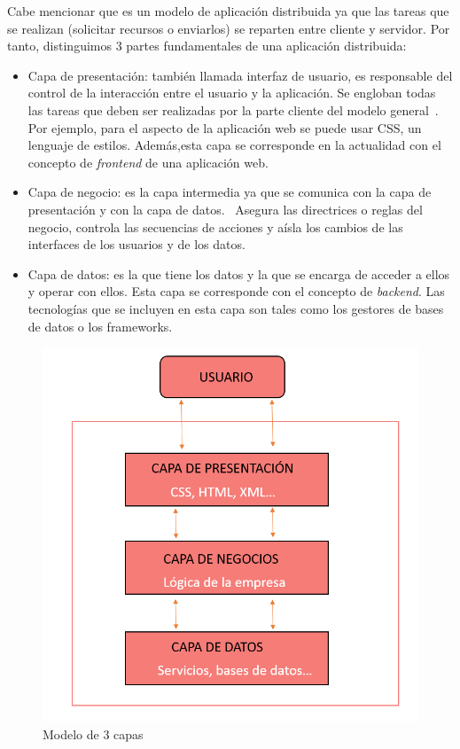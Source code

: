 \documentclass[a4paper, 12pt]{book}
\begin{document}
Cabe mencionar que es un modelo de aplicación distribuida ya que las tareas que se realizan (solicitar recursos o enviarlos) se reparten entre cliente y servidor. Por tanto, distinguimos 3 partes fundamentales de una aplicación distribuida:
\begin{itemize}
    \item Capa de presentación: también llamada interfaz de usuario, es responsable del control de la interacción entre el usuario y la aplicación. Se engloban todas las tareas que deben ser realizadas por la parte cliente del modelo general~\cite{marini2012modelo}. Por ejemplo, para el aspecto de la aplicación web se puede usar CSS, un lenguaje de estilos. Además,esta capa se corresponde en la actualidad con el concepto de \textit{frontend} de una aplicación web.
    \item Capa de negocio: es la capa intermedia ya que se comunica con la capa de presentación y con la capa de datos.~\cite{bazurto2018arquitectura} Asegura las directrices o reglas del negocio, controla las secuencias de acciones y aísla los cambios de las interfaces de los usuarios y de los datos.~\cite{marini2012modelo} 
    \item Capa de datos: es la que tiene los datos y la que se encarga de acceder a ellos y operar con ellos. Esta capa se corresponde con el concepto de \textit{backend}. Las tecnologías que se incluyen en esta capa son tales como los gestores de bases de datos o los frameworks.
\end{itemize}
\begin{figure}[h]
        \centering
        \includegraphics[scale=0.4]{img/3capas.png}
        \caption{Modelo de 3 capas}
        \label{figura:3capas}
\end{figure}
\end{document}
